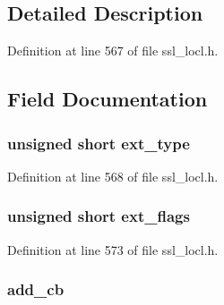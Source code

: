 \subsection{Detailed Description}


Definition at line 567 of file ssl\+\_\+locl.\+h.



\subsection{Field Documentation}
\subsubsection[{\texorpdfstring{ext\+\_\+type}{ext_type}}]{\setlength{\rightskip}{0pt plus 5cm}unsigned short ext\+\_\+type}\hypertarget{structcustom__ext__method_a831116752b7116d4db671346e0b20d76}{}\label{structcustom__ext__method_a831116752b7116d4db671346e0b20d76}


Definition at line 568 of file ssl\+\_\+locl.\+h.

\subsubsection[{\texorpdfstring{ext\+\_\+flags}{ext_flags}}]{\setlength{\rightskip}{0pt plus 5cm}unsigned short ext\+\_\+flags}\hypertarget{structcustom__ext__method_a6d02348c67aa49a74ae38bac11865dc0}{}\label{structcustom__ext__method_a6d02348c67aa49a74ae38bac11865dc0}


Definition at line 573 of file ssl\+\_\+locl.\+h.

\subsubsection[{\texorpdfstring{add\+\_\+cb}{add_cb}}]{ add\+\_\+cb}\hypertarget{structcustom__ext__method_afedf7390fec3693c001838db547cef04}{}\label{structcustom__ext__method_afedf7390fec3693c001838db547cef04}


